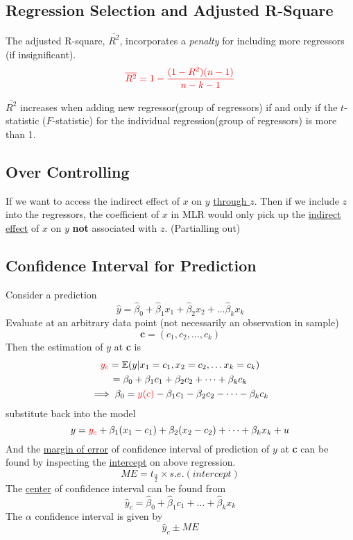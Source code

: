 \documentclass[]{article}
\begin{document}
    	\subsection{Regression Selection and Adjusted R-Square}
    		\par The adjusted R-square, $\overline{R^2}$, incorporates a \emph{penalty} for including more regressors (if insignificant).
    		\[
    			\textcolor{red}{\overline{R^2} = 1 - \frac{(1-R^2)(n-1)}{n-k-1}}
    		\]
    		\begin{remark}
    			$\overline{R^2}$ increases when adding new regressor(group of regressors) if and only if the $t$-statistic ($F$-statistic) for the individual regression(group of regressors) is more than 1.
    		\end{remark}
    	
    	\subsection{Over Controlling}
    		\begin{example}
    			If we want to access the indirect effect of $x$ on $y$ \ul{through $z$}. Then if we include $z$ into the regressors, the coefficient of $x$ in MLR would only pick up the \ul{indirect effect} of $x$ on $y$ \textbf{not} associated with $z$. (Partialling out)
    		\end{example}
    	
    	\subsection{Confidence Interval for Prediction}
    		\par Consider a prediction 
    		\[
    			\hat{y} = \hat{\beta}_0 + \hat{\beta}_1 x_1 + \hat{\beta}_2 x_2 + \dots \hat{\beta}_k x_k
    		\]
    		Evaluate at an arbitrary data point (not necessarily an observation in sample)
    		\[
    			\textbf{c} = (c_1, c_2, \dots ,c_k)
    		\]
    		Then the estimation of $y$ at \textbf{c} is 
    		\begin{gather*}
    			\textcolor{red}{y_c} = \mathbb{E}({y|x_1=c_1, x_2=c_2, \dots x_k=c_k}) \\
    			= \beta_0 + \beta_1 c_1 + \beta_2 c_2 + \dots + \beta_k c_k \\
    			\implies \beta_0 = \textcolor{red}{y(c)} - \beta_1 c_1 - \beta_2 c_2 - \dots - \beta_k c_k
    		\end{gather*}
    		substitute back into the model
    		\[
    			y = \textcolor{red}{y_c} + \beta_1 (x_1 - c_1) + \beta_2 (x_2 - c_2) + \dots + \beta_k x_k + u
    		\]
    		And the \ul{margin of error} of confidence interval of prediction of $y$ at \textbf{c} can be found by inspecting the \ul{intercept} on above regression.
    		\[
    			ME = t_{\frac{\alpha}{2}} \times s.e. (intercept)
    		\]
      		The \ul{center} of confidence interval can be found from 
    		\[
    			\hat{y}_c = \hat{\beta}_0 + \hat{\beta}_1 c_1 + \dots + \hat{\beta}_k x_k
      		\]
      		The $\alpha$ confidence interval is given by
      		\[
      			\hat{y}_c \pm ME
      		\]
      		
\end{document}
